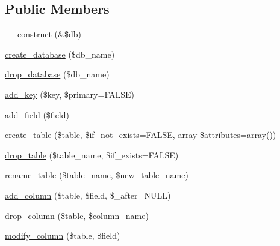 \subsection*{Public Members}
\begin{DoxyCompactItemize}
\item 
\mbox{\hyperlink{class_c_i___d_b__forge_aaf2ef772755ec6f361d44e16cc9ffd69}{\+\_\+\+\_\+construct}} (\&\$db)
\item 
\mbox{\hyperlink{class_c_i___d_b__forge_a902a7267babceb2ce595706f217e00ad}{create\+\_\+database}} (\$db\+\_\+name)
\item 
\mbox{\hyperlink{class_c_i___d_b__forge_a9612987b2d4230de2638d15857e92e67}{drop\+\_\+database}} (\$db\+\_\+name)
\item 
\mbox{\hyperlink{class_c_i___d_b__forge_a70e5c5fca213d8ad84cc71ba1698c3dd}{add\+\_\+key}} (\$key, \$primary=F\+A\+L\+SE)
\item 
\mbox{\hyperlink{class_c_i___d_b__forge_acdaeff5aae80d6128c7ed9817ee82f1c}{add\+\_\+field}} (\$field)
\item 
\mbox{\hyperlink{class_c_i___d_b__forge_a0904375ba759fbe7961b424a46c0adae}{create\+\_\+table}} (\$table, \$if\+\_\+not\+\_\+exists=F\+A\+L\+SE, array \$attributes=array())
\item 
\mbox{\hyperlink{class_c_i___d_b__forge_ac46bdab43413dcc115d1be4a05dbcd0f}{drop\+\_\+table}} (\$table\+\_\+name, \$if\+\_\+exists=F\+A\+L\+SE)
\item 
\mbox{\hyperlink{class_c_i___d_b__forge_a0fb4802acad335ebdecd921d59de9a51}{rename\+\_\+table}} (\$table\+\_\+name, \$new\+\_\+table\+\_\+name)
\item 
\mbox{\hyperlink{class_c_i___d_b__forge_a855261dcf98c0cf401aa469994919c51}{add\+\_\+column}} (\$table, \$field, \$\+\_\+after=N\+U\+LL)
\item 
\mbox{\hyperlink{class_c_i___d_b__forge_aed0d6a0b12511dbdf19bb68fed7fd467}{drop\+\_\+column}} (\$table, \$column\+\_\+name)
\item 
\mbox{\hyperlink{class_c_i___d_b__forge_aa03cc8de0ac9ce03016bd2b50ddeff87}{modify\+\_\+column}} (\$table, \$field)
\end{DoxyCompactItemize}

